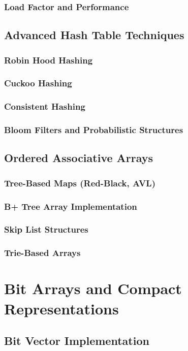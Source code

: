 \documentclass[12pt, oneside]{book}
\begin{document}
\subsubsection{Load Factor and Performance}

\subsection{Advanced Hash Table Techniques}
\subsubsection{Robin Hood Hashing}
\subsubsection{Cuckoo Hashing}
\subsubsection{Consistent Hashing}
\subsubsection{Bloom Filters and Probabilistic Structures}

\subsection{Ordered Associative Arrays}
\subsubsection{Tree-Based Maps (Red-Black, AVL)}
\subsubsection{B+ Tree Array Implementation}
\subsubsection{Skip List Structures}
\subsubsection{Trie-Based Arrays}

\section{Bit Arrays and Compact Representations}
\subsection{Bit Vector Implementation}
\end{document}
